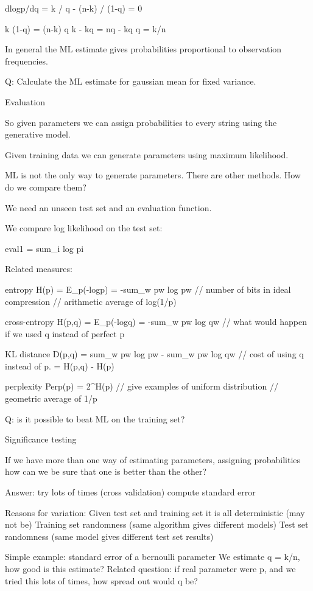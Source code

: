 dlogp/dq = k / q - (n-k) / (1-q) = 0

k (1-q)  = (n-k) q
k - kq = nq - kq
q = k/n

In general the ML estimate gives probabilities proportional to
observation frequencies.

Q: Calculate the ML estimate for gaussian mean for fixed variance.



Evaluation

So given parameters we can assign probabilities to every string using
the generative model.

Given training data we can generate parameters using maximum
likelihood.

ML is not the only way to generate parameters.  There are other
methods.  How do we compare them?  

We need an unseen test set and an evaluation function.

We compare log likelihood on the test set:

eval1 = sum_i log pi

Related measures:

entropy H(p) = E_p(-logp) = -sum_w pw log pw 
// number of bits in ideal compression
// arithmetic average of log(1/p)

cross-entropy H(p,q) = E_p(-logq) = -sum_w pw log qw  
// what would happen if we used q instead of perfect p

KL distance D(p,q) = sum_w pw log pw - sum_w pw log qw  
// cost of using q instead of p. = H(p,q) - H(p)

perplexity Perp(p) = 2^H(p)
// give examples of uniform distribution
// geometric average of 1/p

Q: is it possible to beat ML on the training set?


Significance testing

If we have more than one way of estimating parameters, assigning
probabilities how can we be sure that one is better than the other?

Answer: try lots of times (cross validation)
compute standard error

Reasons for variation: 
Given test set and training set it is all deterministic (may not be)
Training set randomness (same algorithm gives different models)
Test set randomness (same model gives different test set results)

Simple example: standard error of a bernoulli parameter
We estimate q = k/n, how good is this estimate?
Related question: if real parameter were p, and we tried this lots of
times, how spread out would q be?

